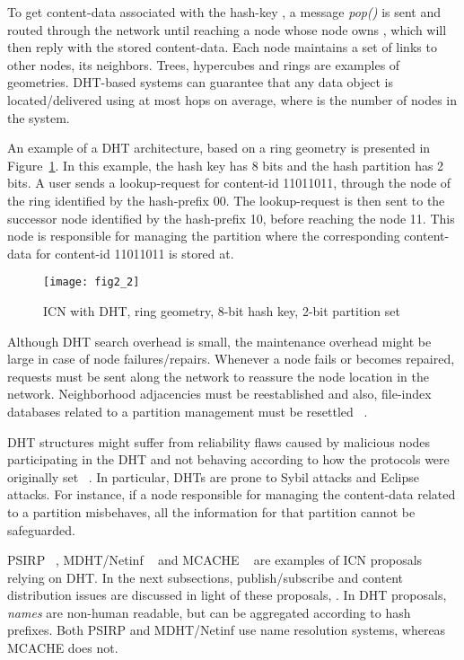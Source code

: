 To get content-data associated with the hash-key , a message \emph{pop()} 
is sent and routed through the network until reaching a node whose node  owns , which will then reply with the stored content-data. 
Each node maintains a set of links to other nodes, its neighbors. Trees, hypercubes and rings are examples of geometries. 
DHT-based systems can guarantee that any data object is located/delivered using at most  hops on average, where  
is the number of nodes in the system. 


An example of a DHT architecture, based on a ring geometry is presented in Figure~\ref{systemdhticn}. In this example, the hash key  
has 8 bits and the hash partition has 2 bits. A user sends a 
lookup-request for content-id 11011011, through the node of the ring identified by the hash-prefix  00. The lookup-request is 
then sent to the successor node identified by the hash-prefix  10, before reaching the node  11. This node is responsible for managing 
the partition where the corresponding content-data for content-id 11011011 is stored at.


\begin{figure}
\center
\texttt{[image: fig2\_2]}
\caption{ICN with DHT, ring geometry, 8-bit hash key, 2-bit partition set}
\label{systemdhticn}
\end{figure}


Although DHT search overhead is small, the maintenance overhead might be large in case of node failures/repairs.  
Whenever a node fails or becomes repaired, requests must be sent along the network to reassure the node location in the network.
Neighborhood adjacencies must be reestablished and also, file-index databases related to a partition management must be resettled 
~\cite{dhtmanagement}. 



DHT structures might suffer from reliability flaws 
caused by malicious nodes participating in the DHT and not behaving according to how the protocols were originally set ~\cite{securitydht}.
In particular, DHTs are prone to Sybil attacks and Eclipse attacks. For instance, if a node responsible for managing
the content-data related to a partition misbehaves, all the information for that partition cannot be safeguarded.



PSIRP ~\cite{psirp}, MDHT/Netinf ~\cite{mdht} and MCACHE  ~\cite{multicache} are examples of ICN proposals relying on DHT. 
In the next subsections, publish/subscribe and content distribution issues are discussed in light of these proposals, . 
In DHT proposals, \emph{names} are non-human readable, but can be aggregated according to hash prefixes.  
Both PSIRP and MDHT/Netinf use name resolution systems, whereas MCACHE does not.


